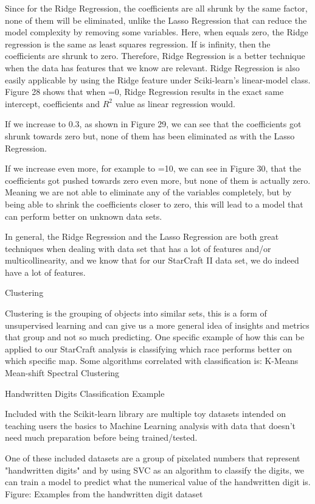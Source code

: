 \documentclass[a4paper,12pt]{report}
\begin{document}
Since for the Ridge Regression, the coefficients are all shrunk by the same factor, none of them will be eliminated, unlike the Lasso Regression that can reduce the model complexity by removing some variables. Here, when  equals zero, the Ridge regression is the same as least squares regression. If  is infinity, then the coefficients are shrunk to zero. Therefore, Ridge Regression is a better technique when the data has features that we know are relevant. Ridge Regression is also easily applicable by using the Ridge feature under Sciki-learn’s linear-model class. Figure 28 shows that when =0, Ridge Regression results in the exact same intercept, coefficients and $R^2$ value as linear regression would. 

If we increase  to 0.3, as shown in Figure 29, we can see that the coefficients got shrunk towards zero but, none of them has been eliminated as with the Lasso Regression. 

If we increase  even more, for example to =10, we can see in Figure 30, that the coefficients got pushed towards zero even more, but none of them is actually zero. Meaning we are not able to eliminate any of the variables completely, but by being able to shrink the coefficients closer to zero, this will lead to a model that can perform better on unknown data sets. 

In general, the Ridge Regression and the Lasso Regression are both great techniques when dealing with data set that has a lot of features and/or multicollinearity, and we know that for our StarCraft II data set, we do indeed have a lot of features.

Clustering

Clustering is the grouping of objects into similar sets, this is a form of unsupervised learning and can give us a more general idea of insights and metrics that group and not so much predicting. One specific example of how this can be applied to our StarCraft analysis is classifying which race performs better on which specific map. Some algorithms correlated with classification is:
K-Means
Mean-shift
Spectral Clustering

Handwritten Digits Classification Example

Included with the Scikit-learn library are multiple toy datasets intended on teaching users the basics to Machine Learning analysis with data that doesn’t need much preparation before being trained/tested.

One of these included datasets are a group of pixelated numbers that represent "handwritten digits" and by using SVC as an algorithm to classify the digits, we can train a model to predict what the numerical value of the handwritten digit is.
	Figure: Examples from the handwritten digit dataset
\end{document}
